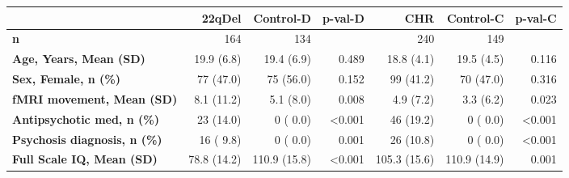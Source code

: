 \begin{longtable}{l|rrrrrr}
\toprule
\multicolumn{1}{l}{} & 22qDel & Control-D & p-val-D & CHR & Control-C & p-val-C \\ 
\midrule\addlinespace[2.5pt]
\textbf{n} &  164 &   134 &  &   240 &   149 &  \\ 
\textbf{Age, Years, Mean (SD)} & 19.9 (6.8) &  19.4 (6.9) &  0.489 &  18.8 (4.1) &  19.5 (4.5) &  0.116 \\ 
\textbf{Sex, Female, n (\%)} &   77 (47.0)  &    75 (56.0)  &  0.152 &    99 (41.2)  &    70 (47.0)  &  0.316 \\ 
\textbf{fMRI movement, Mean (SD)} &  8.1 (11.2) &   5.1 (8.0) &  0.008 &   4.9 (7.2) &   3.3 (6.2) &  0.023 \\ 
\textbf{Antipsychotic med, n (\%)} &   23 (14.0)  &     0 ( 0.0)  & <0.001 &    46 (19.2)  &     0 ( 0.0)  & <0.001 \\ 
\textbf{Psychosis diagnosis, n (\%)} &   16 ( 9.8)  &     0 ( 0.0)  &  0.001 &    26 (10.8)  &     0 ( 0.0)  & <0.001 \\ 
\textbf{Full Scale IQ, Mean (SD)} & 78.8 (14.2) & 110.9 (15.8) & <0.001 & 105.3 (15.6) & 110.9 (14.9) &  0.001 \\ 
\bottomrule
\end{longtable}

